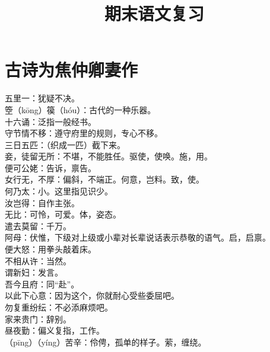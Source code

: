 \documentclass[a4paper, 12pt]{article}
\title{期末语文复习}
\date{}
\begin{document}
    \maketitle
    \section{古诗为焦仲卿妻作}
        \noindent 五里一：犹疑不决。
        \\ 箜（k\={o}ng）篌（h\'{o}u）：古代的一种乐器。
        \\ 十六诵：泛指一般经书。
        \\ 守节情不移：遵守府里的规则，专心不移。
        \\ 三日五匹：（织成一匹）截下来。
        \\ 妾，徒留无所：不堪，不能胜任。驱使，使唤。施，用。
        \\ 便可公姥：告诉，禀告。
        \\ 女行无，不厚：偏斜，不端正。何意，岂料。致，使。
        \\ 何乃太：小。这里指见识少。
        \\ 汝岂得：自作主张。
        \\ 无比：可怜，可爱。体，姿态。
        \\ 遣去莫留：千万。
        \\ 阿母：伏惟，下级对上级或小辈对长辈说话表示恭敬的语气。启，启禀。
        \\ 便大怒：用拳头敲着床。
        \\ 不相从许：当然。
        \\ 谓新妇：发言。
        \\ 吾今且府：同“赴”。
        \\ 以此下心意：因为这个，你就耐心受些委屈吧。
        \\ 勿复重纷纭：不必添麻烦吧。
        \\ 家来贵门：辞别。
        \\ 昼夜勤：偏义复指，工作。
        \\ （p\={i}ng）（y\'{i}ng）苦辛：伶俜，孤单的样子。萦，缠绕。
\end{document}
